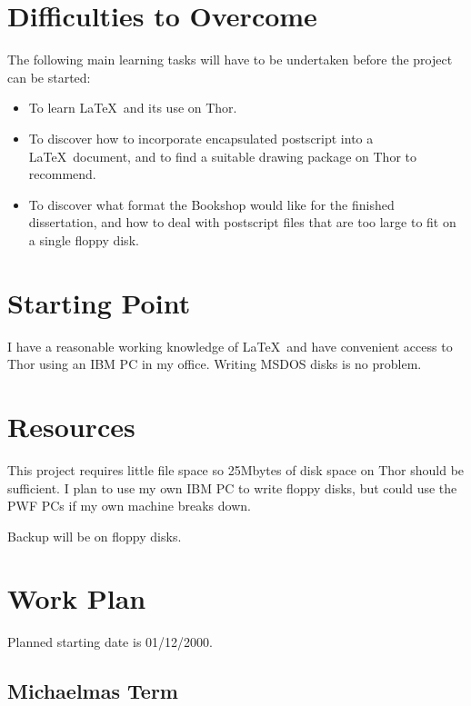 \documentclass[12pt,a4paper, headings=standardclasses]{scrartcl}
\begin{document}
\section*{Difficulties to Overcome}

The following main learning tasks will have to be undertaken before 
the project can be started:

\begin{itemize}

\item To learn \LaTeX\ and its use on Thor.

\item To discover how to incorporate encapsulated postscript into
a \LaTeX\ document, and to find a suitable drawing package on Thor
to recommend.

\item To discover what format the Bookshop would like for the finished
dissertation, and how to deal with postscript files that are too
large to fit on a single floppy disk.

\end{itemize}



\section*{Starting Point}

I have a reasonable working knowledge of \LaTeX\ and have convenient
access to Thor using an IBM PC in my office. Writing MSDOS disks is no 
problem.

\section*{Resources}

This project requires little file space so 25Mbytes of disk space on Thor
should be sufficient. I plan to use my own IBM PC to write floppy disks, 
but could use the PWF PCs if my own machine breaks down. 

Backup will be on floppy disks.

\section*{Work Plan}

Planned starting date is 01/12/2000.

\subsection*{Michaelmas Term} 
\end{document}
